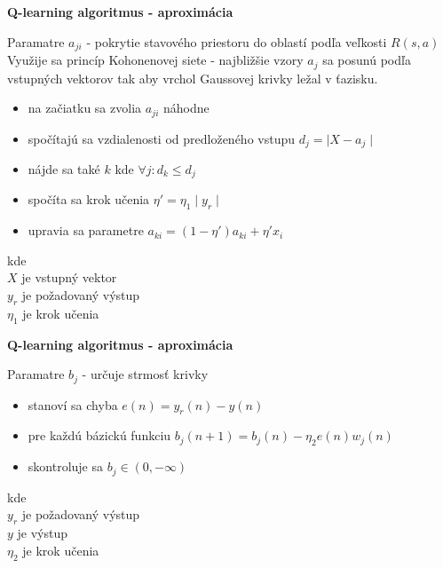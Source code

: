 \documentclass[xcolor=dvipsnames]{beamer}
\begin{document}
\begin{frame}{\bf Q-learning algoritmus - aproximácia}

Paramatre $a_{ji}$ - pokrytie stavového priestoru do oblastí podľa veľkosti $R(s, a)$
Využije sa princíp Kohonenovej siete - najbližšie vzory $a_j$ sa posunú podľa vstupných
vektorov tak aby vrchol Gaussovej krivky ležal v ťazisku.
\\
\begin{itemize}
\item na začiatku sa zvolia $a_{ji}$ náhodne
\item spočítajú sa vzdialenosti od predloženého vstupu $d_j = \mid X - a_{j} \mid$
\item nájde sa také $k$ kde  $\forall{j} : d_k \leq d_j$
\item spočíta sa krok učenia $\eta' = \eta_1 \mid y_r \mid$
\item upravia sa parametre $a_{ki} = (1 - \eta')a_{ki} + \eta' x_{i}$
\end{itemize}

kde \\
$X$ je vstupný vektor \\
$y_r$ je požadovaný výstup \\
$\eta_1$ je krok učenia \\

\end{frame}

\begin{frame}{\bf Q-learning algoritmus - aproximácia}

Paramatre $b_{j}$ - určuje strmosť krivky

\begin{itemize}
\item stanoví sa chyba $e(n) = y_r(n) - y(n)$
\item pre každú bázickú funkciu  $b_j(n+1)= b_j(n) -\eta_2 e(n)w_j(n)$
\item skontroluje sa $b_j \in (0, -\infty)$
\end{itemize}

kde \\
$y_r$ je požadovaný výstup \\
$y$ je výstup\\
$\eta_2$ je krok učenia \\

\end{frame}
\end{document}
